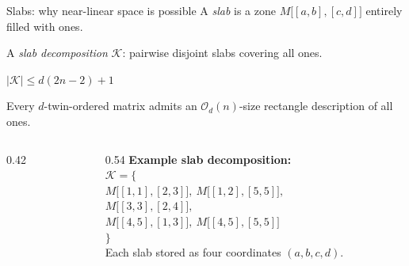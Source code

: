 \documentclass[aspectratio=169,11pt]{beamer}
\renewcommand{\leq}{\leqslant}
\newcommand{\Oh}{\mathcal{O}}
\newcommand{\fillslab}[6]{\fill[#1,opacity=0.66] ({#4-1},{#6-#3}) rectangle ({#5},{#6+1-#2});}
\newcommand{\drawslab}[6]{\draw[#1,very thick] ({#4-1},{#6-#3}) rectangle ({#5},{#6+1-#2});}
\begin{document}
\begin{frame}{Slabs: why near-linear space is possible}
A \emph{slab} is a zone $M\bigl[[a,b],[c,d]\bigr]$ entirely filled with ones.

A \emph{slab decomposition} $\mathcal{K}$: pairwise disjoint slabs covering all ones.

\medskip
\begin{alertblock}{}
$|\mathcal{K}| \leq d(2n-2)+1$
\end{alertblock}

{\small Every $d$-twin-ordered matrix admits an $\Oh_d(n)$-size rectangle description of all ones.}

\bigskip
\begin{columns}[T]
\begin{column}{0.42\textwidth}
\centering
{}
\end{column}
\begin{column}{0.54\textwidth}
{\small
\textbf{Example slab decomposition:}\\[4pt]
$\mathcal{K}=\{$\\
\hspace*{1em}$M\bigl[[1,1],[2,3]\bigr],\ M\bigl[[1,2],[5,5]\bigr],$\\
\hspace*{1em}$M\bigl[[3,3],[2,4]\bigr],$\\
\hspace*{1em}$M\bigl[[4,5],[1,3]\bigr],\ M\bigl[[4,5],[5,5]\bigr]$\\
$\}$\\[4pt]

\medskip
Each slab stored as four coordinates $(a,b,c,d)$.
}
\end{column}
\end{columns}
\end{frame}
\end{document}
